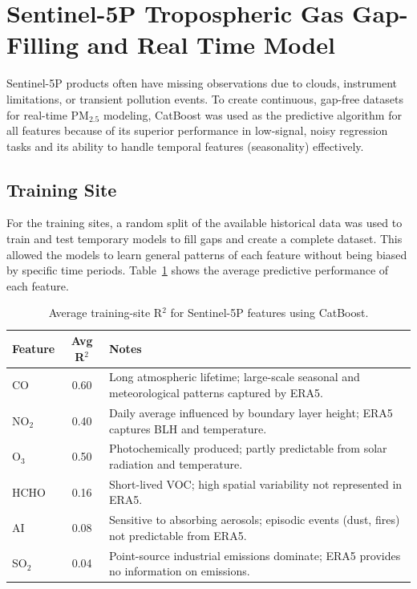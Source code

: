 \documentclass[12pt]{report}
\begin{document}
\section{Sentinel-5P Tropospheric Gas Gap-Filling and Real Time Model}

Sentinel-5P products often have missing observations due to clouds, instrument limitations, or transient pollution events. To create continuous, gap-free datasets for real-time PM$_{2.5}$ modeling, CatBoost was used as the predictive algorithm for all features because of its superior performance in low-signal, noisy regression tasks and its ability to handle temporal features (seasonality) effectively.

\subsection{Training Site}
For the training sites, a random split of the available historical data was used to train and test temporary models to fill gaps and create a complete dataset. This allowed the models to learn general patterns of each feature without being biased by specific time periods. Table~\ref{tab:s5p_training} shows the average predictive performance of each feature.
\begin{table}[H]
\centering
\caption{Average training-site R$^2$ for Sentinel-5P features using CatBoost.}
\label{tab:s5p_training}
\vspace{.3cm}
\begin{tabular}{|l|c|p{8cm}|}
\hline
\textbf{Feature} & \textbf{Avg R$^2$} & \textbf{Notes} \\
\hline
CO   & 0.60 & Long atmospheric lifetime; large-scale seasonal and meteorological patterns captured by ERA5. \\
\hline
NO$_2$ & 0.40 & Daily average influenced by boundary layer height; ERA5 captures BLH and temperature. \\
\hline
O$_3$  & 0.50 & Photochemically produced; partly predictable from solar radiation and temperature. \\
\hline
HCHO & 0.16 & Short-lived VOC; high spatial variability not represented in ERA5. \\
\hline
AI   & 0.08 & Sensitive to absorbing aerosols; episodic events (dust, fires) not predictable from ERA5. \\
\hline
SO$_2$ & 0.04 & Point-source industrial emissions dominate; ERA5 provides no information on emissions. \\
\hline
\end{tabular}
\end{table}
\end{document}
